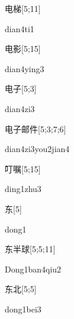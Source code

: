 \begin{verbete}[dian4ti1]{电梯}[5;11]
\begin{pronuncia}{dian4ti1}
\end{pronuncia}
\end{verbete}

\begin{verbete}{电影}[5;15]
\begin{pronuncia}{dian4ying3}
\end{pronuncia}
\end{verbete}

\begin{verbete}[dian4zi3]{电子}[5;3]
\begin{pronuncia}{dian4zi3}
\end{pronuncia}
\end{verbete}

\begin{verbete}{电子邮件}[5;3;7;6]
\begin{pronuncia}[\\]{dian4zi3you2jian4}
\end{pronuncia}
\end{verbete}

\begin{verbete}{叮嘱}[5;15]
\begin{pronuncia}{ding1zhu3}
\end{pronuncia}
\end{verbete}

\begin{verbete}[dong1]{东}[5]
\begin{pronuncia}{dong1}
\end{pronuncia}
\end{verbete}

\begin{verbete}{东半球}[5;5;11]
\begin{pronuncia}{Dong1ban4qiu2}
\end{pronuncia}
\end{verbete}

\begin{verbete}{东北}[5;5]
\begin{pronuncia}{dong1bei3}
\end{pronuncia}
\end{verbete}

